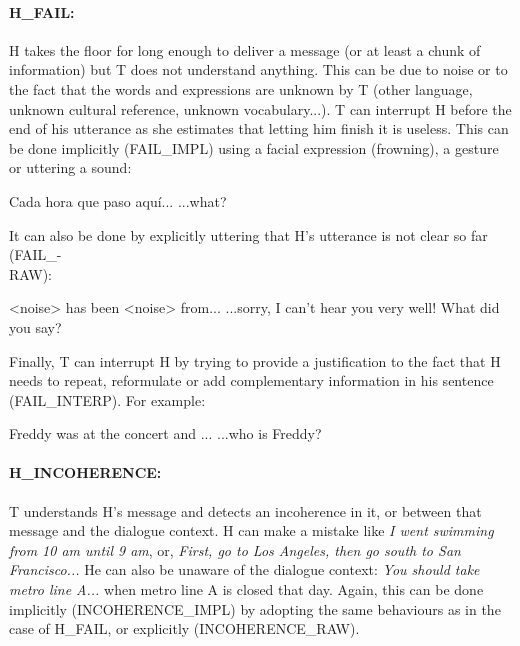         \paragraph{H\_FAIL:} H takes the floor for long enough to deliver a message (or at least a chunk of information) but T does not understand anything. This can be due to noise or to the fact that the words and expressions are unknown by T (other language, unknown cultural reference, unknown vocabulary...). T can interrupt H before the end of his utterance as she estimates that letting him finish it is useless. This can be done implicitly (FAIL\_IMPL) using a facial expression (frowning), a gesture or uttering a sound:
				
					\begin{dialogue}
						 Cada hora que paso aqu\'i...
						 ...what?
					\end{dialogue}
					
					It can also be done by explicitly uttering that H's utterance is not clear so far (FAIL\_-\\RAW):
					
					\begin{dialogue}
						 <noise> has been <noise> from...
						 ...sorry, I can't hear you very well! What did you say?
					\end{dialogue}
					
					Finally, T can interrupt H by trying to provide a justification to the fact that H needs to repeat, reformulate or add complementary information in his sentence (FAIL\_INTERP). For example:
					
					\begin{dialogue}
						 Freddy was at the concert and ...
						 ...who is Freddy?
					\end{dialogue}
					
				\paragraph{H\_INCOHERENCE:} T understands H's message and detects an incoherence in it, or between that message and the dialogue context. H can make a mistake like \textit{I went swimming from 10 am until 9 am}, or, \textit{First, go to Los Angeles, then go south to San Francisco...} He can also be unaware of the dialogue context: \textit{You should take metro line A...} when metro line A is closed that day. Again, this can be done implicitly (INCOHERENCE\_IMPL) by adopting the same behaviours as in the case of H\_FAIL, or explicitly (INCOHERENCE\_RAW).
					
